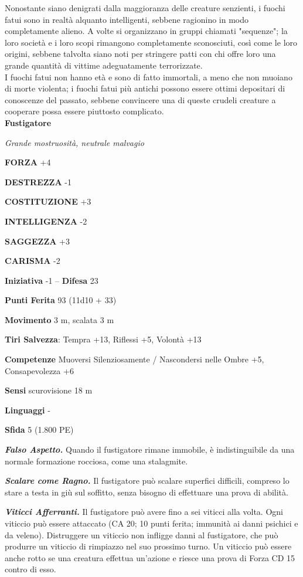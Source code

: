 \begin{multicols}{2}
Nonostante siano denigrati dalla maggioranza delle creature senzienti, i fuochi fatui sono in realtà alquanto intelligenti, sebbene ragionino in modo completamente alieno. A volte si organizzano in gruppi chiamati "sequenze"; la loro società e i loro scopi rimangono completamente sconosciuti, così come le loro origini, sebbene talvolta siano noti per stringere patti con chi offre loro una grande quantità di vittime adeguatamente terrorizzate.\\

I fuochi fatui non hanno età e sono di fatto immortali, a meno che non muoiano di morte violenta; i fuochi fatui più antichi possono essere ottimi depositari di conoscenze del passato, sebbene convincere una di queste crudeli creature a cooperare possa essere piuttosto complicato.\\


\medskip{}\textbf{Fustigatore}

\emph{Grande mostruosità, neutrale malvagio}

\textbf{FORZA} +4

\textbf{DESTREZZA} -1

\textbf{COSTITUZIONE} +3

\textbf{INTELLIGENZA} -2

\textbf{SAGGEZZA} +3

\textbf{CARISMA} -2

\textbf{Iniziativa} -1 -- \textbf{Difesa} 23

\textbf{Punti Ferita} 93 (11d10 + 33)

\textbf{Movimento} 3 m, scalata 3 m

\textbf{Tiri Salvezza}: Tempra +13, Riflessi +5, Volontà +13

\textbf{Competenze} Muoversi Silenziosamente / Nascondersi nelle Ombre +5, Consapevolezza +6

\textbf{Sensi} scurovisione 18 m

\textbf{Linguaggi} -

\textbf{Sfida} 5 (1.800 PE)

\emph{\textbf{Falso Aspetto.}} Quando il fustigatore rimane immobile, è indistinguibile da una normale formazione rocciosa, come una stalagmite.

\emph{\textbf{Scalare come Ragno.}} Il fustigatore può scalare superfici difficili, compreso lo stare a testa in giù sul soffitto, senza bisogno di effettuare una prova di abilità.

\emph{\textbf{Viticci Afferranti.}} Il fustigatore può avere fino a sei viticci alla volta. Ogni viticcio può essere attaccato (CA 20; 10 punti ferita; immunità ai danni psichici e da veleno). Distruggere un viticcio non infligge danni al fustigatore, che può produrre un viticcio di rimpiazzo nel suo prossimo turno. Un viticcio può essere anche rotto se una creatura effettua un'azione e riesce una prova di Forza CD 15 contro di esso.


\end{multicols}
